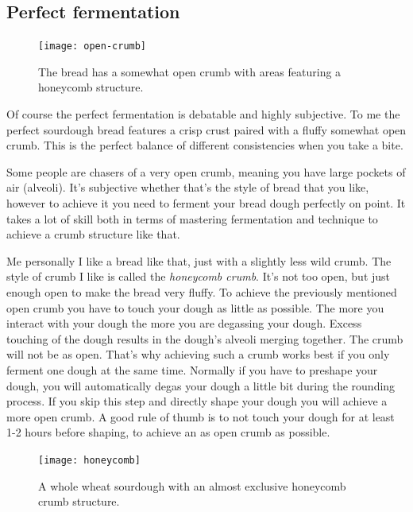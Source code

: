 \subsection{Perfect fermentation}

\begin{figure}
  \texttt{[image: open-crumb]}
  \caption{The bread has a somewhat open crumb with areas
  featuring a honeycomb structure.}
  \label{fig:open-crumb}
\end{figure}

Of course the perfect fermentation is debatable and highly subjective. To
me the perfect sourdough bread features a crisp crust paired with a fluffy
somewhat open crumb. This is the perfect balance of different consistencies
when you take a bite.

Some people are chasers of a very open crumb, meaning you have large pockets
of air (alveoli). It's subjective whether that's the style of bread that you like,
however to achieve it you need to ferment your bread dough perfectly on point.
It takes a lot of skill both in terms of mastering fermentation and technique
to achieve a crumb structure like that.

Me personally I like a bread like that, just with a slightly less wild crumb.
The style of crumb I like is called the {\it honeycomb crumb}. It's not too open, but
just enough open to make the bread very fluffy. To achieve the previously mentioned open crumb you
have to touch your dough as little as possible. The more you interact with your
dough the more you are degassing your dough. Excess touching of the dough
results in the dough's alveoli merging together. The crumb will not be as open.
That's why achieving such a crumb works best if you only ferment
one dough at the same time. Normally if you have to preshape your dough,
you will automatically degas your dough a little bit during the rounding process.
If you skip this step and directly shape your dough you will achieve a more open crumb.
A good rule of thumb is to not touch your dough for at least 1-2 hours before shaping,
to achieve an as open crumb as possible.

\begin{figure}
  \texttt{[image: honeycomb]}
  \caption{A whole wheat sourdough with an almost exclusive honeycomb crumb structure.}
  \label{fig:honeycomb}
\end{figure}


